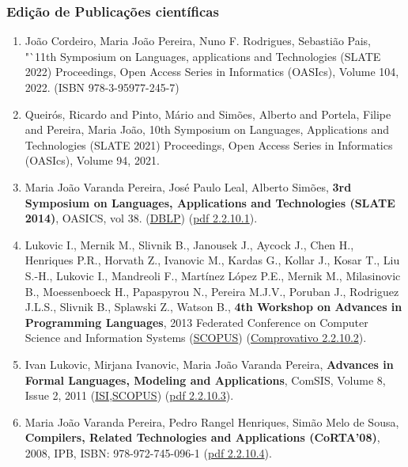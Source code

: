 \documentclass[11pt]{article}
\begin{document}
\subsubsection{Edição de Publicações científicas}
\begin{enumerate}
\item {João Cordeiro, Maria João Pereira, Nuno F. Rodrigues, Sebastião Pais, "`11th Symposium on Languages, applications and Technologies (SLATE 2022) Proceedings, Open Access Series in Informatics (OASIcs), Volume 104, 2022. (ISBN 978-3-95977-245-7)}
\item {Queir\'{o}s, Ricardo and Pinto, M\'{a}rio and Sim\~{o}es, Alberto and Portela, Filipe and Pereira, Maria Jo\~{a}o, 10th Symposium on Languages, Applications and Technologies (SLATE 2021) Proceedings, Open Access Series in Informatics (OASIcs), Volume 94, 2021.}
\item {Maria João Varanda Pereira, José Paulo Leal, Alberto Simões, {\bf{ 3rd Symposium on Languages, Applications and Technologies (SLATE 2014)}}, OASICS, vol 38. (\href{run:Publicacoes/ComprovativosDBLP.pdf}{DBLP}) (\href{run:Publicacoes/PROCslate2014.pdf}{pdf 2.2.10.1}).}
\item {Lukovic I., Mernik M., Slivnik B., Janousek J., Aycock J., Chen H., Henriques P.R., Horvath Z., Ivanovic M., Kardas G., Kollar J., Kosar T., Liu S.-H., Lukovic I., Mandreoli F., Martínez López P.E., Mernik M., Milasinovic B., Moessenboeck H., Papaspyrou N., Pereira M.J.V., Poruban J., Rodriguez J.L.S., Slivnik B., Splawski Z., Watson B., {\bf{ 4th Workshop on Advances in Programming Languages}}, 2013 Federated Conference on Computer Science and Information Systems (\href{run:Publicacoes/PublicacoesSCOPUS.pdf}{SCOPUS}) (\href{run:OutrasActCientif/EDWAPL2013.pdf}{Comprovativo 2.2.10.2}).}
\item {Ivan Lukovic, Mirjana Ivanovic, Maria João Varanda Pereira, {\bf{ Advances in Formal Languages, Modeling and Applications}}, ComSIS, Volume 8, Issue 2, 2011 (\href{run:Publicacoes/ComprovativosISI.pdf}{ISI},\href{run:Publicacoes/PublicacoesSCOPUS.pdf}{SCOPUS}) (\href{run:Publicacoes/ComSIS0802.pdf}{pdf 2.2.10.3}).}
\item {Maria João Varanda Pereira, Pedro Rangel Henriques, Simão Melo de Sousa, {\bf{ Compilers, Related Technologies and Applications (CoRTA'08)}}, 2008, IPB, ISBN: 978-972-745-096-1 (\href{run:Publicacoes/ActasCORTA08VFR.pdf}{pdf 2.2.10.4}).}
\end{enumerate}
\end{document}
